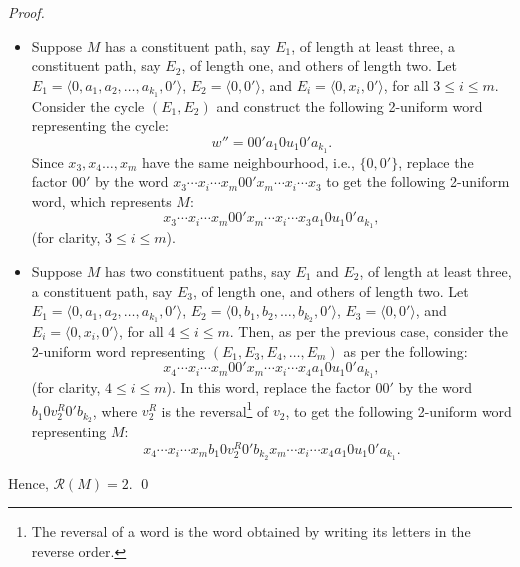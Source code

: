 \documentclass{llncs}
\begin{document}
\begin{proof}
\begin{itemize}
		\item Suppose $M$ has a constituent path, say $E_1$, of length at least three, a constituent path, say $E_2$, of length one, and others of length two. Let $E_1 = \langle 0, a_1, a_2, \ldots, a_{k_1}, 0' \rangle$, $E_2 = \langle 0, 0' \rangle$, and $E_i = \langle 0,x_i,0' \rangle$, for all $3 \le i \le m$. Consider the cycle $(E_1, E_2)$ and construct the following 2-uniform word representing the cycle:
		$$w'' =  0 0' a_1 0 u_1 0' a_{k_1}.$$
		Since $x_3,x_4 \ldots, x_m$ have the same neighbourhood, i.e., $\{0,0'\}$, replace the factor $00'$ by the word $x_3 \cdots x_i \cdots x_m 0 0' x_m \cdots x_i \cdots x_3$ to get the following 2-uniform word, which represents $M$:
		$$x_3 \cdots x_i \cdots x_m 0 0' x_m \cdots x_i \cdots x_3 a_1 0 u_1 0' a_{k_1},$$ (for clarity, $3 \le i \le m$).
		
		\item Suppose $M$ has two constituent paths, say $E_1$ and $E_2$, of length at least three, a constituent path, say $E_3$, of length one, and others of length two. Let $E_1 = \langle 0, a_1, a_2, \ldots, a_{k_1}, 0' \rangle$,  $E_2 = \langle 0, b_1, b_2, \ldots, b_{k_2}, 0' \rangle$, $E_3 = \langle 0, 0'\rangle$, and $E_i = \langle 0, x_i, 0' \rangle$, for all $4 \le i \le m$. Then, as per the previous case, consider the 2-uniform word representing $(E_1, E_3, E_4, \ldots, E_m)$ as per the following:
		$$x_4 \cdots x_i \cdots x_m 0 0' x_m \cdots x_i \cdots x_4  a_1 0 u_1 0' a_{k_1},$$ (for clarity, $4 \le i \le m$).
		In this word, replace the factor $00'$ by the word $b_1 0 v_2^R 0' b_{k_2}$, where $v_2^R$ is the reversal\footnote{The reversal of a word is the word obtained by writing its letters in the reverse order.} of $v_2$, to get the following 2-uniform word representing $M$:
		$$x_4 \cdots x_i \cdots x_m b_1 0 v_2^R 0' b_{k_2} x_m \cdots x_i \cdots x_4 a_1 0 u_1 0' a_{k_1}.$$ 
	\end{itemize}
	Hence, $\mathcal{R}(M) = 2$. \qed
\end{proof}
\end{document}
